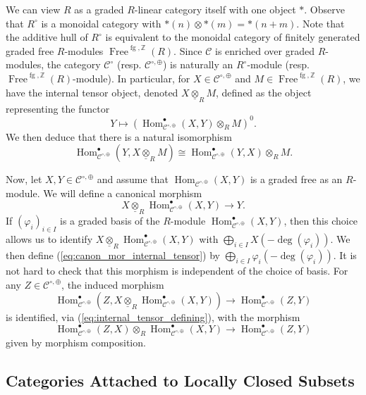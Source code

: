 \documentclass{amsart}
\newcommand{\Z}{\mathbb{Z}}
\newcommand{\scrC}{\mathcal{C}}
\DeclareMathOperator{\Hom}{Hom}
\DeclareMathOperator{\Free}{Free}
\DeclareMathOperator{\fg}{fg}
\theoremstyle{definition}
\numberwithin{equation}{subsection}
\begin{document}
We can view $R$ as a graded $R$-linear category itself with one object $*$. Observe that $R^{\circ}$ is a monoidal category with $* (n) \otimes * (m) = * (n+m)$. 
Note that the additive hull of $R^{\circ}$ is equivalent to the monoidal category of finitely generated graded free $R$-modules $\Free^{\fg, \Z} (R)$.
Since $\scrC$ is enriched over graded $R$-modules, the category $\scrC^{\circ}$ (resp. $\scrC^{\circ, \oplus}$) is naturally an $R^{\circ}$-module (resp. $\Free^{\fg, \Z} (R)$-module).
In particular, for $X \in \scrC^{\circ, \oplus}$ and $M \in \Free^{\fg, \Z} (R)$, we have the internal tensor object, denoted $X \underline{\otimes}_R M$, defined as the object representing the functor
\[Y \mapsto (\Hom_{\scrC^{\circ, \oplus}}^{\bullet} (X,Y) \otimes_R M)^{0}.\]
We then deduce that there is a natural isomorphism
\begin{equation}\label{eq:internal_tensor_defining}
    \Hom_{\scrC^{\circ, \oplus}}^{\bullet} (Y, X \underline{\otimes}_R M) \cong \Hom_{\scrC^{\circ, \oplus}}^{\bullet} (Y, X) \otimes_R M.
\end{equation}

Now, let $X, Y \in \scrC^{\circ, \oplus}$ and assume that $\Hom_{\scrC^{\circ, \oplus}} (X, Y)$ is a graded free as an $R$-module.
We will define a canonical morphism
\begin{equation}\label{eq:canon_mor_internal_tensor}
    X \underline{\otimes}_R \Hom_{\scrC^{\circ, \oplus}}^{\bullet} (X, Y) \to Y.
\end{equation}
If $(\varphi_i)_{i \in I}$ is a graded basis of the $R$-module $\Hom_{\scrC^{\circ, \oplus}}^{\bullet} (X, Y)$, then this choice allows us to identify $ X \underline{\otimes}_R \Hom_{\scrC^{\circ, \oplus}}^{\bullet} (X, Y)$ with $\bigoplus_{i \in I} X (-\deg (\varphi_i))$.
We then define (\ref{eq:canon_mor_internal_tensor}) by $\bigoplus_{i \in I} \varphi_i (- \deg (\varphi_i))$.
It is not hard to check that this morphism is independent of the choice of basis. For any $Z \in \scrC^{\circ, \oplus}$, the induced morphism
\[\Hom_{\scrC^{\circ, \oplus}}^{\bullet} (Z, X \underline{\otimes}_R \Hom_{\scrC^{\circ, \oplus}}^{\bullet} (X, Y)) \to \Hom_{\scrC^{\circ, \oplus}}^{\bullet} (Z, Y)\]
is identified, via (\ref{eq:internal_tensor_defining}), with the morphism
\[\Hom_{\scrC^{\circ, \oplus}}^{\bullet} (Z, X) \otimes_R \Hom_{\scrC^{\circ, \oplus}}^{\bullet} (X, Y) \to \Hom_{\scrC^{\circ, \oplus}}^{\bullet} (Z, Y)\]
given by morphism composition.

\subsection{Categories Attached to Locally Closed Subsets}
\end{document}

